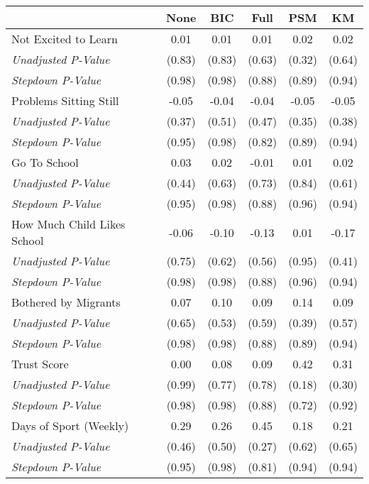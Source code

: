 \begin{tabular}{l c c c c c}
\toprule
 & None & BIC & Full & PSM & KM \\
\midrule
Not Excited to Learn & 0.01 & 0.01 & 0.01 & 0.02 & 0.02 \\
\quad \textit{Unadjusted P-Value} & (0.83) & (0.83) & (0.63) & (0.32) & (0.64) \\
\quad \textit{Stepdown P-Value} & (0.98) & (0.98) & (0.88) & (0.89) & (0.94) \\
Problems Sitting Still & -0.05 & -0.04 & -0.04 & -0.05 & -0.05 \\
\quad \textit{Unadjusted P-Value} & (0.37) & (0.51) & (0.47) & (0.35) & (0.38) \\
\quad \textit{Stepdown P-Value} & (0.95) & (0.98) & (0.82) & (0.89) & (0.94) \\
Go To School & 0.03 & 0.02 & -0.01 & 0.01 & 0.02 \\
\quad \textit{Unadjusted P-Value} & (0.44) & (0.63) & (0.73) & (0.84) & (0.61) \\
\quad \textit{Stepdown P-Value} & (0.95) & (0.98) & (0.88) & (0.96) & (0.94) \\
How Much Child Likes School & -0.06 & -0.10 & -0.13 & 0.01 & -0.17 \\
\quad \textit{Unadjusted P-Value} & (0.75) & (0.62) & (0.56) & (0.95) & (0.41) \\
\quad \textit{Stepdown P-Value} & (0.98) & (0.98) & (0.88) & (0.96) & (0.94) \\
Bothered by Migrants & 0.07 & 0.10 & 0.09 & 0.14 & 0.09 \\
\quad \textit{Unadjusted P-Value} & (0.65) & (0.53) & (0.59) & (0.39) & (0.57) \\
\quad \textit{Stepdown P-Value} & (0.98) & (0.98) & (0.88) & (0.89) & (0.94) \\
Trust Score & 0.00 & 0.08 & 0.09 & 0.42 & 0.31 \\
\quad \textit{Unadjusted P-Value} & (0.99) & (0.77) & (0.78) & (0.18) & (0.30) \\
\quad \textit{Stepdown P-Value} & (0.98) & (0.98) & (0.88) & (0.72) & (0.92) \\
Days of Sport (Weekly) & 0.29 & 0.26 & 0.45 & 0.18 & 0.21 \\
\quad \textit{Unadjusted P-Value} & (0.46) & (0.50) & (0.27) & (0.62) & (0.65) \\
\quad \textit{Stepdown P-Value} & (0.95) & (0.98) & (0.81) & (0.94) & (0.94) \\
\bottomrule
\end{tabular}
